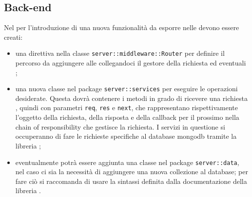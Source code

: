 \documentclass[12pt,a4paper]{article}
\begin{document}
	\subsection{Back-end}
	Nel  per l'introduzione di una nuova funzionalità da esporre nelle  devono essere creati:
	\begin{itemize}
	\item una direttiva nella classe \texttt{server::middleware::Router} per definire il percorso da aggiungere alle  collegandoci il gestore della richiesta ed eventuali ;
	\item una nuova classe nel package \texttt{server::services} per eseguire le operazioni desiderate. Questa dovrà contenere i metodi in grado di ricevere una richiesta , quindi con parametri \texttt{req}, \texttt{res} e \texttt{next}, che rappresentano rispettivamente l’oggetto della richiesta, della risposta e della callback per il prossimo  nella chain of responsibility che gestisce la richiesta. I servizi in questione si occuperanno di fare le richieste specifiche al database mongodb tramite la libreria ;
	\item eventualmente potrà essere aggiunta una classe nel package \texttt{server::data}, nel caso ci sia la necessità di aggiungere una nuova collezione al database; per fare ciò si raccomanda di usare la sintassi definita dalla documentazione della libreria .
	\end{itemize}
\end{document}
